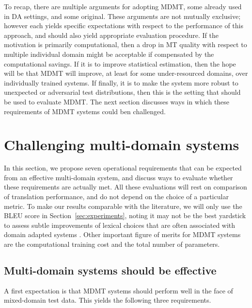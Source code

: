 \documentclass[11pt,a4paper]{article}
\newcommand{\fyDone}[1]{\done[FY]\Todo[FY:]{\textcolor{orange}{#1}}}
\begin{document}
\fyDone{recap}
To recap, there are multiple arguments for adopting MDMT, some already used in DA settings, and some original. These arguments are not mutually exclusive; however each yields specific expectations with respect to the performance of this approach, and should also yield appropriate evaluation procedure. If the motivation is primarily computational, then a drop in MT quality with respect to multiple individual domain might be acceptable if compensated by the computational savings. If it is to improve statistical estimation, then the hope will be that MDMT will improve, at least for some under-resourced domains, over individually trained systems. If finally, it is to make the system more robust to unexpected or adversarial test distributions, then this is the setting that should be used to evaluate MDMT. The next section discusses ways in which these requirements of MDMT systems could ben challenged. 

\section{Challenging multi-domain systems \label{sec:challenging}}
In this section, we propose seven\fyDone{check number} operational requirements that can be expected from an effective multi-domain system, and discuss ways to evaluate whether these requirements are actually met. All these evaluations will rest on comparison of translation performance, and do not depend on the choice of a particular metric. To make our results comparable with the literature, we will only use the BLEU score \cite{Papineni02bleu} in Section~\ref{sec:experiments}, noting it may not be the best yardstick to assess subtle improvements of lexical choices that are often associated with domain adapted systems \cite{Irvine13measuring}. Other important figure of merits for MDMT systems are the computational training cost and the total number of parameters.\fyDone{Insert discussion about scores}

\subsection{Multi-domain systems should be effective \label{ssec:effective}}
A first expectation is that MDMT systems should perform well in the face of mixed-domain test data. This yields the following three requirements.
\end{document}
